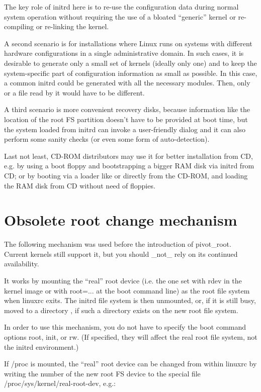 \documentclass[a4paper,8pt,english]{sphinxmanual}
\begin{document}
The key role of initrd here is to re-use the configuration data during
normal system operation without requiring the use of a bloated ``generic''
kernel or re-compiling or re-linking the kernel.

A second scenario is for installations where Linux runs on systems with
different hardware configurations in a single administrative domain. In
such cases, it is desirable to generate only a small set of kernels
(ideally only one) and to keep the system-specific part of configuration
information as small as possible. In this case, a common initrd could be
generated with all the necessary modules. Then, only  or a file
read by it would have to be different.

A third scenario is more convenient recovery disks, because information
like the location of the root FS partition doesn't have to be provided at
boot time, but the system loaded from initrd can invoke a user-friendly
dialog and it can also perform some sanity checks (or even some form of
auto-detection).

Last not least, CD-ROM distributors may use it for better installation
from CD, e.g. by using a boot floppy and bootstrapping a bigger RAM disk
via initrd from CD; or by booting via a loader like  or directly
from the CD-ROM, and loading the RAM disk from CD without need of
floppies.


\section{Obsolete root change mechanism}
\label{admin-guide/initrd:obsolete-root-change-mechanism}
The following mechanism was used before the introduction of pivot\_root.
Current kernels still support it, but you should \_not\_ rely on its
continued availability.

It works by mounting the ``real'' root device (i.e. the one set with rdev
in the kernel image or with root=... at the boot command line) as the
root file system when linuxrc exits. The initrd file system is then
unmounted, or, if it is still busy, moved to a directory , if
such a directory exists on the new root file system.

In order to use this mechanism, you do not have to specify the boot
command options root, init, or rw. (If specified, they will affect
the real root file system, not the initrd environment.)

If /proc is mounted, the ``real'' root device can be changed from within
linuxrc by writing the number of the new root FS device to the special
file /proc/sys/kernel/real-root-dev, e.g.:
\end{document}
